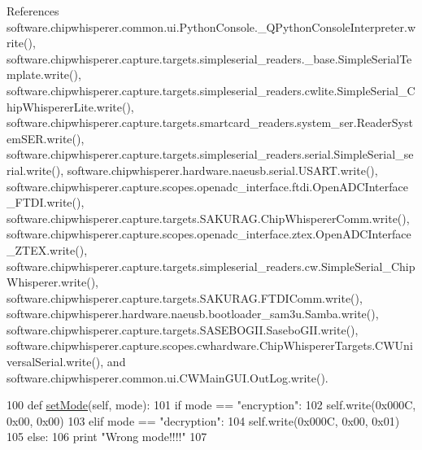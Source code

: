 References software.\+chipwhisperer.\+common.\+ui.\+Python\+Console.\+\_\+\+Q\+Python\+Console\+Interpreter.\+write(), software.\+chipwhisperer.\+capture.\+targets.\+simpleserial\+\_\+readers.\+\_\+base.\+Simple\+Serial\+Template.\+write(), software.\+chipwhisperer.\+capture.\+targets.\+simpleserial\+\_\+readers.\+cwlite.\+Simple\+Serial\+\_\+\+Chip\+Whisperer\+Lite.\+write(), software.\+chipwhisperer.\+capture.\+targets.\+smartcard\+\_\+readers.\+system\+\_\+ser.\+Reader\+System\+S\+E\+R.\+write(), software.\+chipwhisperer.\+capture.\+targets.\+simpleserial\+\_\+readers.\+serial.\+Simple\+Serial\+\_\+serial.\+write(), software.\+chipwhisperer.\+hardware.\+naeusb.\+serial.\+U\+S\+A\+R\+T.\+write(), software.\+chipwhisperer.\+capture.\+scopes.\+openadc\+\_\+interface.\+ftdi.\+Open\+A\+D\+C\+Interface\+\_\+\+F\+T\+D\+I.\+write(), software.\+chipwhisperer.\+capture.\+targets.\+S\+A\+K\+U\+R\+A\+G.\+Chip\+Whisperer\+Comm.\+write(), software.\+chipwhisperer.\+capture.\+scopes.\+openadc\+\_\+interface.\+ztex.\+Open\+A\+D\+C\+Interface\+\_\+\+Z\+T\+E\+X.\+write(), software.\+chipwhisperer.\+capture.\+targets.\+simpleserial\+\_\+readers.\+cw.\+Simple\+Serial\+\_\+\+Chip\+Whisperer.\+write(), software.\+chipwhisperer.\+capture.\+targets.\+S\+A\+K\+U\+R\+A\+G.\+F\+T\+D\+I\+Comm.\+write(), software.\+chipwhisperer.\+hardware.\+naeusb.\+bootloader\+\_\+sam3u.\+Samba.\+write(), software.\+chipwhisperer.\+capture.\+targets.\+S\+A\+S\+E\+B\+O\+G\+I\+I.\+Sasebo\+G\+I\+I.\+write(), software.\+chipwhisperer.\+capture.\+scopes.\+cwhardware.\+Chip\+Whisperer\+Targets.\+C\+W\+Universal\+Serial.\+write(), and software.\+chipwhisperer.\+common.\+ui.\+C\+W\+Main\+G\+U\+I.\+Out\+Log.\+write().


\begin{DoxyCode}
100     \textcolor{keyword}{def }\hyperlink{classsoftware_1_1chipwhisperer_1_1capture_1_1targets_1_1SASEBOGII_1_1SaseboGIIDPAContest_a60e37b120c7485c4e26f70ed84eb405e}{setMode}(self, mode):
101         \textcolor{keywordflow}{if} mode == \textcolor{stringliteral}{"encryption"}:
102             self.write(0x000C, 0x00, 0x00)
103         \textcolor{keywordflow}{elif} mode == \textcolor{stringliteral}{"decryption"}:
104             self.write(0x000C, 0x00, 0x01)
105         \textcolor{keywordflow}{else}:
106             \textcolor{keywordflow}{print} \textcolor{stringliteral}{"Wrong mode!!!!"}
107 
\end{DoxyCode}
\hypertarget{classsoftware_1_1chipwhisperer_1_1capture_1_1targets_1_1SASEBOGII_1_1SaseboGIIDPAContest_a02325d6e59b1bf1aeab3c8724584a29b}{}
